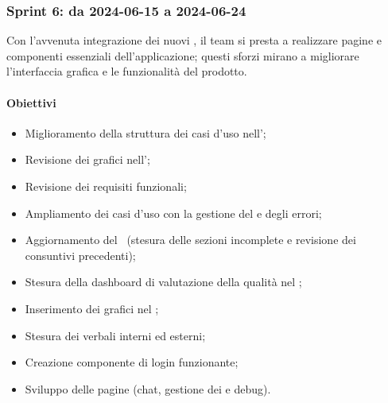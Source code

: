 \subsubsection{Sprint 6: da 2024-06-15 a 2024-06-24}
\par Con l'avvenuta integrazione dei nuovi , il team si presta a realizzare pagine e componenti essenziali dell'applicazione; questi sforzi mirano a migliorare l'interfaccia grafica e le funzionalità del prodotto.


\paragraph{Obiettivi}
\begin{itemize}
  \item Miglioramento della struttura dei casi d'uso nell'\AdR;
  \item Revisione dei grafici nell'\AdR;
  \item Revisione dei requisiti funzionali;
  \item Ampliamento dei casi d'uso con la gestione del  e degli errori;
  \item Aggiornamento del \PdP\ (stesura delle sezioni incomplete e revisione dei consuntivi precedenti);
  \item Stesura della dashboard di valutazione della qualità nel \PdQ;
  \item Inserimento dei grafici nel \PdQ;
  \item Stesura dei verbali interni ed esterni;
  \item Creazione componente di login funzionante;
  \item Sviluppo delle pagine  (chat, gestione dei  e debug).
\end{itemize}

\vspace{0.5\baselineskip}
\par [Inserire Gantt]
